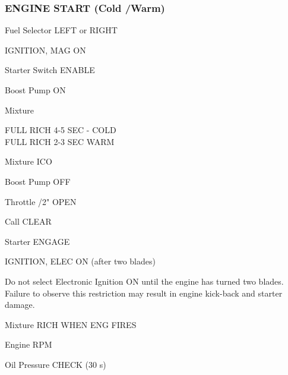 \begin{multicols}{2}
\subsubsection*{ENGINE START (Cold /Warm)}
\begin{enumerate*}
\item Fuel Selector \dotfill LEFT or RIGHT
\item IGNITION, MAG \dotfill ON
\item Starter Switch \dotfill ENABLE
\item Boost Pump \dotfill ON
\item Mixture \raggedright \dotfill FULL RICH 4-5 SEC - COLD\\\dotfill FULL RICH 2-3 SEC WARM
\item Mixture \dotfill ICO
\item Boost Pump \dotfill OFF
\item Throttle /2" OPEN
\item Call \dotfill CLEAR
\item Starter \dotfill ENGAGE
\item IGNITION, ELEC \dotfill ON (after two blades)
\begin{Note}[CAUTION]
Do not select Electronic Ignition ON until the engine
has turned two blades. Failure to observe this restriction may result
in engine kick-back and starter damage.
\end{Note}
\item Mixture \dotfill RICH WHEN ENG FIRES
\item Engine  RPM
\item Oil Pressure \dotfill CHECK (30 s)
\end{enumerate*}


\end{multicols}
